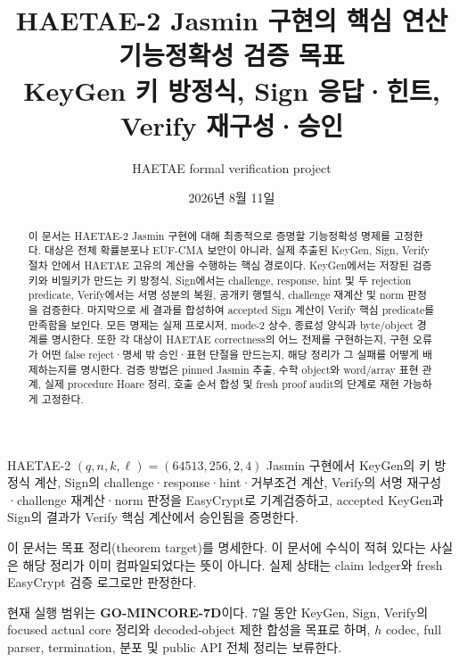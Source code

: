 \documentclass[11pt,a4paper]{article}
\title{\textbf{HAETAE-2 Jasmin 구현의 핵심 연산\\기능정확성 검증 목표}\\[0.45em]
  \Large KeyGen 키 방정식, Sign 응답·힌트, Verify 재구성·승인}
\author{HAETAE formal verification project}
\date{2026년 8월 11일}
\begin{document}
\maketitle

\begin{abstract}
이 문서는 HAETAE-2 Jasmin 구현에 대해 최종적으로 증명할 기능정확성 명제를
고정한다. 대상은 전체 확률분포나 EUF-CMA 보안이 아니라, 실제 추출된
KeyGen, Sign, Verify 절차 안에서 HAETAE 고유의 계산을 수행하는 핵심 경로이다.
KeyGen에서는 저장된 검증키와 비밀키가 만드는 키 방정식,
Sign에서는 challenge, response, hint 및 두 rejection predicate,
Verify에서는 서명 성분의 복원, 공개키 행렬식, challenge 재계산 및 norm 판정을
검증한다. 마지막으로 세 결과를 합성하여 accepted Sign 계산이 Verify 핵심
predicate를 만족함을 보인다. 모든 명제는 실제 프로시저, mode-2 상수,
종료성 양식과 byte/object 경계를 명시한다. 또한 각 대상이 HAETAE correctness의
어느 전제를 구현하는지, 구현 오류가 어떤 false reject·명세 밖 승인·표현 단절을
만드는지, 해당 정리가 그 실패를 어떻게 배제하는지를 명시한다. 검증 방법은
pinned Jasmin 추출, 수학 object와 word/array 표현 관계, 실제 procedure Hoare
정리, 호출 순서 합성 및 fresh proof audit의 단계로 재현 가능하게 고정한다.
\end{abstract}

\begin{reportstatement}
HAETAE-2 \((q,n,k,\ell)=(64513,256,2,4)\) Jasmin 구현에서 KeyGen의
키 방정식 계산, Sign의 challenge·response·hint·거부조건 계산, Verify의
서명 재구성·challenge 재계산·norm 판정을 EasyCrypt로 기계검증하고,
accepted KeyGen과 Sign의 결과가 Verify 핵심 계산에서 승인됨을 증명한다.
\end{reportstatement}

\begin{statusnote}
이 문서는 목표 정리(theorem target)를 명세한다. 이 문서에 수식이 적혀 있다는
사실은 해당 정리가 이미 컴파일되었다는 뜻이 아니다. 실제 상태는 claim ledger와
fresh EasyCrypt 검증 로그로만 판정한다.

현재 실행 범위는 \textbf{GO-MINCORE-7D}이다. 7일 동안 KeyGen, Sign, Verify의
focused actual core 정리와 decoded-object 제한 합성을 목표로 하며, \(h\) codec,
full parser, termination, 분포 및 public API 전체 정리는 보류한다.
\end{statusnote}

\tableofcontents
\clearpage












\end{document}
